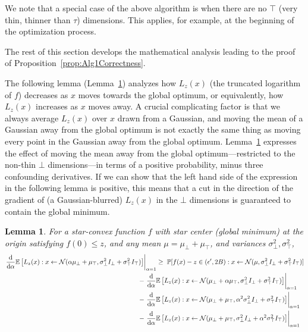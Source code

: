 \documentclass[11pt,letter]{article}
\renewcommand{\Pr}{\mathbb{P}}
\newcommand{\Exp}{\mathbb{E}}
\newcommand{\from}{\leftarrow}
\newcommand{\Normal}{\mathcal{N}}
\renewcommand{\d}{\mathrm{d}}
\newcommand{\Diff}[2][]{\frac{\d#1}{\d#2}}
\newcounter{nTheorems}
\numberwithin{nTheorems}{section}
\newtheorem{lemma}[nTheorems]{Lemma}
\begin{document}
We note that a special case of the above algorithm is when there are no $\top$ (very thin, thinner than $\tau$) dimensions.
This applies, for example, at the beginning of the optimization process.





The rest of this section develops the mathematical analysis leading to the proof of Proposition~\ref{prop:Alg1Correctness}.


The following lemma (Lemma~\ref{lem:CutLB}) analyzes how $L_z(x)$ (the truncated logarithm of $f$) decreases as $x$ moves towards the global optimum, or equivalently, how $L_z(x)$ increases as $x$ moves away.
A crucial complicating factor is that we always average $L_z(x)$ over $x$ drawn from a Gaussian, and moving the mean of a Gaussian away from the global optimum is not exactly the same thing as moving every point in the Gaussian away from the global optimum.
Lemma~\ref{lem:CutLB} expresses the effect of moving the mean away from the global optimum---restricted to the non-thin $\bot$ dimensions---in terms of a positive probability, minus three confounding derivatives.
If we can show that the left hand side of the expression in the following lemma is positive, this means that a cut in the direction of the gradient of (a Gaussian-blurred) $L_z(x)$ in the $\bot$ dimensions is guaranteed to contain the global minimum.
\begin{lemma}
\label{lem:CutLB}
For a star-convex function $f$ with star center (global minimum) at the origin satisfying $f(0) \leq z$, and any mean $\mu=\mu_\bot+\mu_\top$, and variances $\sigma_\bot^2,\sigma_\top^2$,
\begin{align*}
\left.\Diff{\alpha} \Exp\left[L_z(x) : x \from \Normal(\alpha \mu_\bot + \mu_\top, \sigma_\bot^2 I_\bot + \sigma_\top^2 I_\top) \right]\right|_{\alpha = 1}\hspace{-1cm}&\hspace{1cm} \ge \;\Pr[f(x)-z\in (\epsilon',2B) : x \from \Normal(\mu, \sigma_\bot^2 I_\bot + \sigma_\top^2 I_\top)]\\
&-\left.\Diff{\alpha} \Exp\left[L_z(x) : x \from \Normal(\mu_\bot +\alpha \mu_\top, \sigma_\bot^2 I_\bot + \sigma_\top^2 I_\top) \right]\right|_{\alpha = 1}\\
&-\left.\Diff{\alpha} \Exp\left[L_z(x) : x \from \Normal(\mu_\bot + \mu_\top, \alpha^2\sigma_\bot^2 I_\bot + \sigma_\top^2 I_\top) \right]\right|_{\alpha = 1}\\
&-\left.\Diff{\alpha} \Exp\left[L_z(x) : x \from \Normal(\mu_\bot + \mu_\top, \sigma_\bot^2 I_\bot + \alpha^2\sigma_\top^2 I_\top) \right]\right|_{\alpha = 1}
\end{align*}
\end{lemma}
\end{document}
